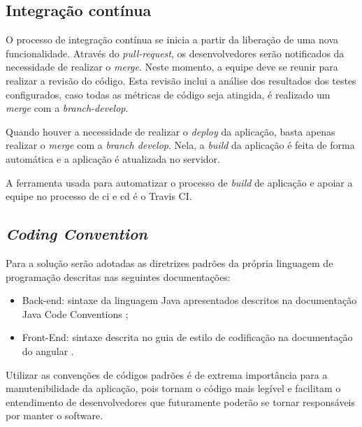 \subsection{Integração contínua}
O processo de integração contínua se inicia a partir da liberação de uma nova funcionalidade. Através do \textit{\gls{pull-request}}, os desenvolvedores serão notificados da necessidade de realizar o \textit{\gls{merge}}. Neste momento, a equipe deve se reunir para realizar a revisão do código. Esta revisão inclui a análise dos resultados dos testes configurados, caso todas as métricas de código seja atingida, é realizado um \textit{\gls{merge}} com a \textit{\gls{branch-develop}}. 


Quando houver a necessidade de realizar o \textit{\gls{deploy}} da aplicação, basta apenas realizar o \textit{merge} com a \textit{branch develop}. Nela, a \textit{\gls{build}} da aplicação é feita de forma automática e a aplicação é atualizada no servidor. 


A ferramenta usada para automatizar o processo de \textit{\gls{build}} de aplicação e apoiar a equipe no processo de \ac{ci} e \ac{cd} é o Travis CI.


\subsection{\textit{Coding Convention}}
Para a solução serão adotadas as diretrizes padrões da própria linguagem de programação descritas nas seguintes documentações:

\begin{itemize}
\item Back-end: sintaxe da linguagem Java  apresentados descritos na documentação Java Code Conventions \cite{javacodeconvention:1997};
\item Front-End: sintaxe descrita no guia de estilo de codificação na documentação do angular \cite{angularstyleguide:2021}.
\end{itemize}


Utilizar as convenções de códigos padrões é de extrema importância para a manutenibilidade da aplicação, pois tornam o código mais legível e facilitam o entendimento de desenvolvedores que futuramente poderão se tornar responsáveis por manter o software.



